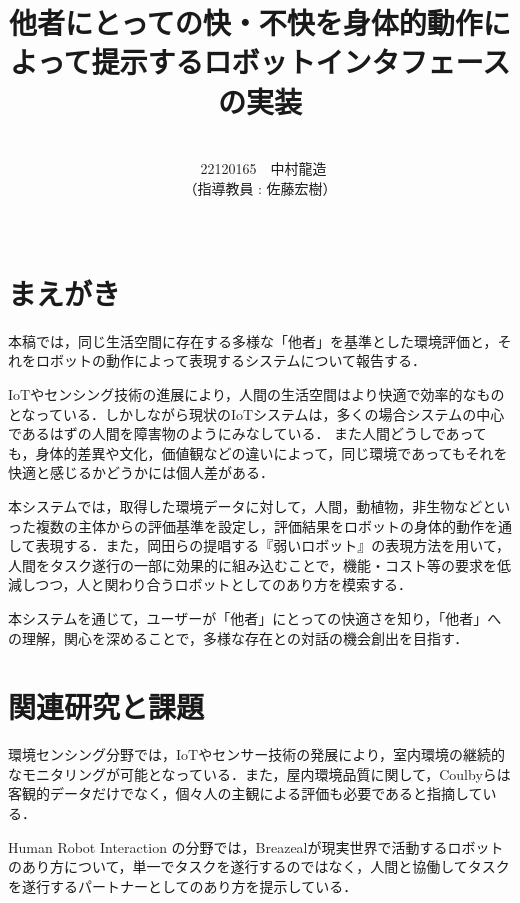 \documentclass[paper=a4paper,jafontsize=9pt,head_space=15mm,gutter=20mm,
twocolumn,number_of_lines=49, line_length=26zw]{myuarticle}
\begin{document}
\title{{\LARGE\bfseries\gtfamily 他者にとっての快・不快を身体的動作によって提示するロボットインタフェースの実装}}
\author{\\\ 22120165　中村龍造 \\ （指導教員 : 佐藤宏樹）\\ \\}
\date{}
\maketitle

\section{まえがき}
本稿では，同じ生活空間に存在する多様な「他者」を基準とした環境評価と，それをロボットの動作によって表現するシステムについて報告する．

IoTやセンシング技術の進展により，人間の生活空間はより快適で効率的なものとなっている．しかしながら現状のIoTシステムは，多くの場合システムの中心であるはずの人間を障害物のようにみなしている\cite{Petrov-2018-WhenIoTKeepsPeople}．
また人間どうしであっても，身体的差異や文化，価値観などの違いによって，同じ環境であってもそれを快適と感じるかどうかには個人差がある．

本システムでは，取得した環境データに対して，人間，動植物，非生物などといった複数の主体からの評価基準を設定し，評価結果をロボットの身体的動作を通して表現する．また，岡田ら\cite{岡田-2017-弱いロボ}の提唱する『弱いロボット』の表現方法を用いて，人間をタスク遂行の一部に効果的に組み込むことで，機能・コスト等の要求を低減しつつ，人と関わり合うロボットとしてのあり方を模索する．

本システムを通じて，ユーザーが「他者」にとっての快適さを知り，「他者」への理解，関心を深めることで，多様な存在との対話の機会創出を目指す．

\section{関連研究と課題}
環境センシング分野では，IoTやセンサー技術の発展により，室内環境の継続的なモニタリングが可能となっている\cite{Saini-2020-IndoorAirQualityMonitoring}．また，屋内環境品質に関して，Coulbyら\cite{Coulby-2020-ScopingReviewTechnologicalApproaches}は客観的データだけでなく，個々人の主観による評価も必要であると指摘している．

Human Robot
Interaction
の分野では，Breazeal\cite{C.Breazeal-2004-SocialInteractionsHRIRobot}が現実世界で活動するロボットのあり方について，単一でタスクを遂行するのではなく，人間と協働してタスクを遂行するパートナーとしてのあり方を提示している．
\end{document}
